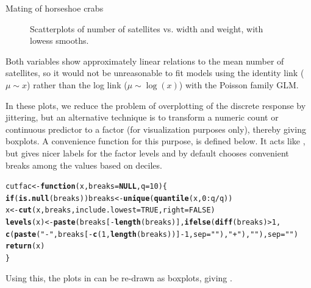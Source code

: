 \documentclass[11pt]{book}\usepackage[]{graphicx}\usepackage[]{color}
\makeatletter
\newcommand{\hlnum}[1]{\textcolor[rgb]{0.686,0.059,0.569}{#1}}%
\newcommand{\hlstr}[1]{\textcolor[rgb]{0.192,0.494,0.8}{#1}}%
\newcommand{\hlopt}[1]{\textcolor[rgb]{0,0,0}{#1}}%
\newcommand{\hlstd}[1]{\textcolor[rgb]{0.345,0.345,0.345}{#1}}%
\newcommand{\hlkwa}[1]{\textcolor[rgb]{0.161,0.373,0.58}{\textbf{#1}}}%
\newcommand{\hlkwb}[1]{\textcolor[rgb]{0.69,0.353,0.396}{#1}}%
\newcommand{\hlkwc}[1]{\textcolor[rgb]{0.333,0.667,0.333}{#1}}%
\newcommand{\hlkwd}[1]{\textcolor[rgb]{0.737,0.353,0.396}{\textbf{#1}}}%
\newenvironment{kframe}{%
 \def\at@end@of@kframe{}%
 \ifinner\ifhmode%
  \def\at@end@of@kframe{\end{minipage}}%
  \begin{minipage}{\columnwidth}%
 \fi\fi%
 \def\FrameCommand##1{\hskip\@totalleftmargin \hskip-\fboxsep
 \colorbox{shadecolor}{##1}\hskip-\fboxsep
     \hskip-\linewidth \hskip-\@totalleftmargin \hskip\columnwidth}%
 \MakeFramed {\advance\hsize-\width
   \@totalleftmargin\z@ \linewidth\hsize
   \@setminipage}}%
 {\par\unskip\endMakeFramed%
 \at@end@of@kframe}
\newenvironment{knitrout}{}{} %
\renewenvironment{knitrout}{\small\renewcommand{\baselinestretch}{.85}}{} %
\makeatother
\begin{document}
\begin{Example}[crabs1]{Mating of horseshoe crabs}
\begin{knitrout}
\begin{figure}[!htbp]
\caption[Scatterplots of number of satellites vs]{Scatterplots of number of satellites vs. width and weight, with lowess smooths.\label{fig:crabs1-scats}}
\end{figure}


\end{knitrout}
Both variables show approximately linear relations to the mean number of satellites, so it
would not be unreasonable to fit models using the identity link ($\mu \sim x$) rather than the log link
($\mu \sim \log(x)$) with the Poisson family GLM.

In these plots, we reduce the problem of overplotting of the discrete response by jittering, but
an alternative technique is to transform a numeric count or continuous predictor to
a factor (for visualization purposes only), thereby giving boxplots.  A convenience function for
this purpose,  is defined below.  It acts like , but gives nicer labels
for the factor levels and by default chooses convenient breaks among the values based on deciles.

\begin{knitrout}\footnotesize
{}\color{fgcolor}\begin{kframe}
\begin{alltt}
\hlstd{cutfac} \hlkwb{<-} \hlkwa{function}\hlstd{(}\hlkwc{x}\hlstd{,} \hlkwc{breaks} \hlstd{=} \hlkwa{NULL}\hlstd{,} \hlkwc{q}\hlstd{=}\hlnum{10}\hlstd{) \{}
  \hlkwa{if}\hlstd{(}\hlkwd{is.null}\hlstd{(breaks)) breaks} \hlkwb{<-} \hlkwd{unique}\hlstd{(}\hlkwd{quantile}\hlstd{(x,} \hlnum{0}\hlopt{:}\hlstd{q}\hlopt{/}\hlstd{q))}
  \hlstd{x} \hlkwb{<-} \hlkwd{cut}\hlstd{(x, breaks,} \hlkwc{include.lowest} \hlstd{=} \hlnum{TRUE}\hlstd{,} \hlkwc{right} \hlstd{=} \hlnum{FALSE}\hlstd{)}
  \hlkwd{levels}\hlstd{(x)} \hlkwb{<-} \hlkwd{paste}\hlstd{(breaks[}\hlopt{-}\hlkwd{length}\hlstd{(breaks)],} \hlkwd{ifelse}\hlstd{(}\hlkwd{diff}\hlstd{(breaks)} \hlopt{>} \hlnum{1}\hlstd{,}
    \hlkwd{c}\hlstd{(}\hlkwd{paste}\hlstd{(}\hlstr{"-"}\hlstd{, breaks[}\hlopt{-}\hlkwd{c}\hlstd{(}\hlnum{1}\hlstd{,} \hlkwd{length}\hlstd{(breaks))]} \hlopt{-} \hlnum{1}\hlstd{,} \hlkwc{sep} \hlstd{=} \hlstr{""}\hlstd{),} \hlstr{"+"}\hlstd{),} \hlstr{""}\hlstd{),} \hlkwc{sep} \hlstd{=} \hlstr{""}\hlstd{)}
  \hlkwd{return}\hlstd{(x)}
\hlstd{\}}
\end{alltt}
\end{kframe}
\end{knitrout}

Using this, the plots in  can be re-drawn as boxplots, giving .


\end{Example}
\end{document}
